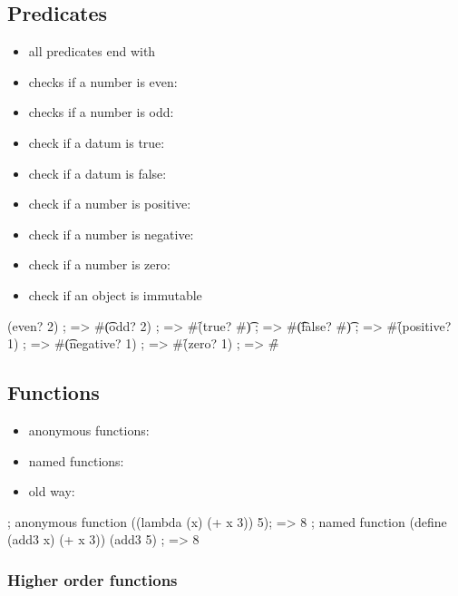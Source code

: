 \documentclass[a4paper,landscape,10pt]{article}
\begin{document}
\begin{multicols*}{2}
  \subsection{Predicates}

  \begin{itemize}
    \item all predicates end with 
    \item checks if a number is even: 
    \item checks if a number is odd: 
    \item check if a datum is true: 
    \item check if a datum is false: 
    \item check if a number is positive: 
    \item check if a number is negative: 
    \item check if a number is zero: 
    \item check if an object is immutable 
  \end{itemize}

  \begin{racket}
(even? 2) ; => #\t
(odd? 2) ; => #\f
(true? #\t) ; => #\t
(false? #\t) ; => #\f
(positive? 1) ; => #\t
(negative? 1) ; => #\f
(zero? 1) ; => #\f
\end{racket}

  \breakcolumn

  \subsection{Functions}

  \begin{itemize}
    \item anonymous functions: 
    \item named functions: 
    \item old way: 
  \end{itemize}

  \begin{racket}
; anonymous function
((lambda (x) (+ x 3)) 5); => 8
; named function
(define (add3 x) (+ x 3))
(add3 5) ; => 8
\end{racket}

  \subsubsection{Higher order functions}


\end{multicols*}
\end{document}
